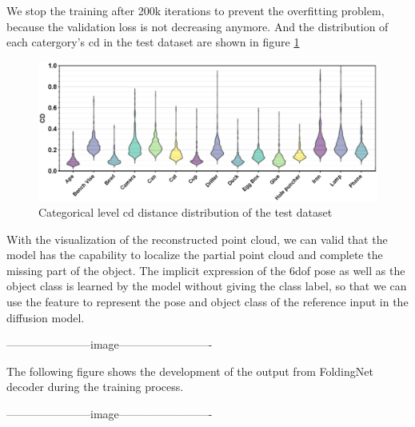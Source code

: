 \documentclass[12pt,DIV14,BCOR12mm,a4paper,footinclude=false,headinclude,parskip=half-,twoside,openright,cleardoublepage=empty,toc=index,bibliography=totoc,listof=totoc]{scrreprt}
\numberwithin{equation}{chapter}
\begin{document}
We stop the training after 200k iterations to prevent the overfitting problem, because the validation loss is not decreasing anymore. And the distribution of each catergory's \gls{cd} in the test dataset are shown in figure \ref{img:cd_cate} 

\begin{figure}[h]
	\centering
	\includegraphics[width=1.\textwidth]{img/cd_category.eps}
	\caption{Categorical level \gls{cd} distance distribution of the test dataset}
	\label{img:cd_cate}
\end{figure}



With the visualization of the reconstructed point cloud, we can valid that the model has the capability to localize the partial point cloud and complete the missing part of the object. The implicit expression of the \gls{6dof} pose as well as the object class is learned by the model without giving the class label, so that we can use the feature to represent the pose and object class of the reference input in the diffusion model.

-----------------------image-------------------------

The following figure shows the development of the output from FoldingNet decoder during the training process.

-----------------------image-------------------------
\end{document}
